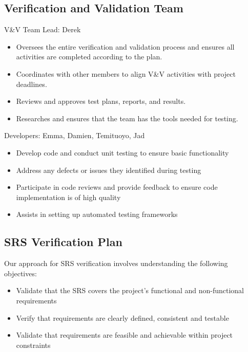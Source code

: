 \documentclass[12pt, titlepage]{article}
\begin{document}
\subsection{Verification and Validation Team}

V\&V Team Lead: Derek
\begin{itemize}
    \item Oversees the entire verification and validation process and ensures all activities are completed according to the plan.
    \item Coordinates with other members to align V\&V activities with project deadlines.
    \item Reviews and approves test plans, reports, and results.
    \item Researches and ensures that the team has the tools needed for testing.
\end{itemize}

\noindent Developers: Emma, Damien, Temituoyo, Jad
\begin{itemize}
    \item Develop code and conduct unit testing to ensure basic functionality
    \item Address any defects or issues they identified during testing
    \item Participate in code reviews and provide feedback to ensure code implementation is of high quality
    \item Assists in setting up automated testing frameworks
\end{itemize}

\subsection{SRS Verification Plan}

\noindent Our approach for SRS verification involves understanding the following objectives:

\begin{itemize}
    \item Validate that the SRS covers the project’s functional and non-functional requirements
    \item Verify that requirements are clearly defined, consistent and testable
    \item Validate that requirements are feasible and achievable within project constraints
\end{itemize}
\end{document}
